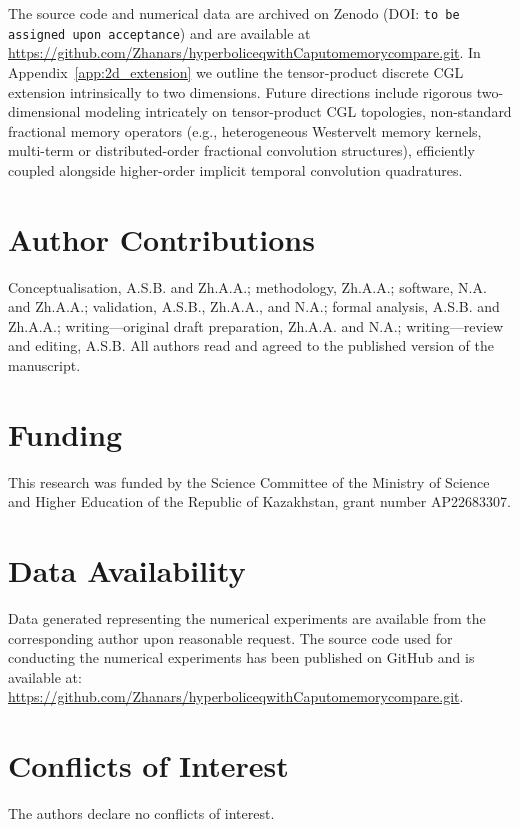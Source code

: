 \documentclass[a4paper,fleqn]{cas-sc}
\begin{document}
The source code and numerical data are archived on Zenodo (DOI: \texttt{to be assigned upon acceptance}) and are available at \url{https://github.com/Zhanars/hyperboliceqwithCaputomemorycompare.git}. In Appendix~\ref{app:2d_extension} we outline the tensor-product discrete CGL extension intrinsically to two dimensions. Future directions include rigorous two-dimensional modeling intricately on tensor-product CGL topologies, non-standard fractional memory operators (e.g., heterogeneous Westervelt memory kernels, multi-term or distributed-order fractional convolution structures), efficiently coupled alongside higher-order implicit temporal convolution quadratures.

\vspace{6pt}

\section*{Author Contributions}
Conceptualisation, A.S.B. and Zh.A.A.; methodology, Zh.A.A.; software, N.A. and Zh.A.A.; validation, A.S.B., Zh.A.A., and N.A.; formal analysis, A.S.B. and Zh.A.A.; writing—original draft preparation, Zh.A.A. and N.A.; writing—review and editing, A.S.B. All authors read and agreed to the published version of the manuscript.

\section*{Funding}
This research was funded by the Science Committee of the Ministry of Science and Higher Education of the Republic of Kazakhstan, grant number AP22683307.

\section*{Data Availability}
Data generated representing the numerical experiments are available from the corresponding author upon reasonable request. The source code used for conducting the numerical experiments has been published on GitHub and is available at: \url{https://github.com/Zhanars/hyperboliceqwithCaputomemorycompare.git}.

\section*{Conflicts of Interest}
The authors declare no conflicts of interest.
\end{document}
